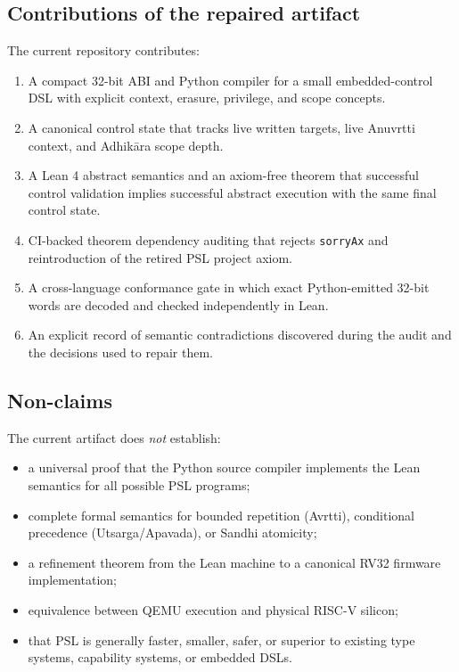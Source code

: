 \documentclass[11pt,a4paper]{article}
\begin{document}
\subsection{Contributions of the repaired artifact}

The current repository contributes:

\begin{enumerate}
\item A compact 32-bit ABI and Python compiler for a small embedded-control
      DSL with explicit context, erasure, privilege, and scope concepts.
\item A canonical control state that tracks live written targets, live
      Anuvrtti context, and Adhik\={a}ra scope depth.
\item A Lean 4 abstract semantics and an axiom-free theorem that successful
      control validation implies successful abstract execution with the same
      final control state.
\item CI-backed theorem dependency auditing that rejects
      \texttt{sorryAx} and reintroduction of the retired PSL project axiom.
\item A cross-language conformance gate in which exact Python-emitted 32-bit
      words are decoded and checked independently in Lean.
\item An explicit record of semantic contradictions discovered during the
      audit and the decisions used to repair them.
\end{enumerate}

\subsection{Non-claims}

The current artifact does \emph{not} establish:

\begin{itemize}
\item a universal proof that the Python source compiler implements the Lean
      semantics for all possible PSL programs;
\item complete formal semantics for bounded repetition (Avrtti),
      conditional precedence (Utsarga/Apavada), or Sandhi atomicity;
\item a refinement theorem from the Lean machine to a canonical RV32
      firmware implementation;
\item equivalence between QEMU execution and physical RISC-V silicon;
\item that PSL is generally faster, smaller, safer, or superior to existing
      type systems, capability systems, or embedded DSLs.
\end{itemize}
\end{document}
